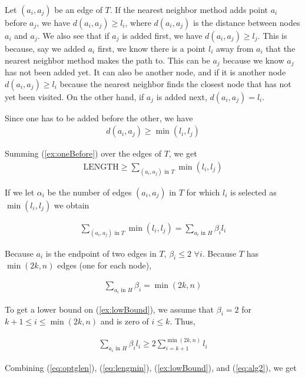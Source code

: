 Let $(a_i,a_j)$ be an edge of $T$. If the nearest neighbor method adds point $a_i$ before $a_j$, we have $d(a_i,a_j) \geq l_i$, where $d(a_i,a_j)$ is the distance between nodes $a_i$ and $a_j$. We also see that if $a_j$ is added first, we have $d(a_i, a_j) \geq l_j$. This is because, say we added $a_i$ first, we know there is a point $l_i$ away from $a_i$ that the nearest neighbor method makes the path to. This can be $a_j$ because we know $a_j$ has not been added yet. It can also be another node, and if it is another node $d(a_i, a_j) \geq l_i$ because the nearest neighbor finds the closest node that has not yet been visited. On the other hand, if $a_j$ is added next, $d(a_i, a_j) = l_i$. 

Since one has to be added before the other, we have 
\begin{align}
d(a_i , a_j) \geq \min(l_i, l_j) \label{ex:oneBefore}
\end{align}

Summing (\ref{ex:oneBefore}) over the edges of $T$, we get
\begin{align}
\text{LENGTH} \geq \sum_{(a_i,a_j) \text{ in } T} \min(l_i,l_j)  \label{eq:lengmin}
\end{align}

If we let $\alpha_i$ be the number of edges $(a_i, a_j)$ in $T$ for which $l_i$ is selected as $\min(l_i, l_j)$ we obtain 

\begin{align}
\sum_{(a_i,a_j) \text{ in } T} \min(l_i, l_j) = \sum_{a_i \text{ in } H} \beta_i l_i  \label{ex:lowBound}
\end{align}

Because $a_i$ is the endpoint of two edges in $T$, $\beta_i \leq 2$ $\forall i$. Because $T$ has $\min(2k,n)$ edges (one for each node),

\begin{align}
\sum_{a_i \text{ in } H} \beta_i = \min(2k,n) 
\end{align}

To get a lower bound on (\ref{ex:lowBound}), we assume that $\beta_i = 2 $ for $k+1 \leq i \leq \min(2k,n)$ and is zero of $i \leq k$. Thus,

\begin{align}
\sum_{a_i \text{ in } H} \beta_i l_i \geq 2 \sum_{i=k+1}^{\min(2k,n)} l_i \label{eq:alg2}
\end{align}

Combining (\ref{eq:optglen}), (\ref{eq:lengmin}), (\ref{ex:lowBound}), and (\ref{eq:alg2}), we get

